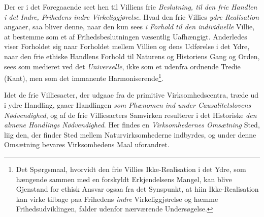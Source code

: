 Der er i det Foregaaende seet hen til Villiens frie \emph{Beslutning, til den
frie Handlen i det Indre, Frihedens indre Virkeliggjørelse}. Hvad den frie
Villies \emph{ydre Realisation} angaaer, saa bliver denne, naar den kun sees
\emph{i Forhold til den individuelle} Villie, at bestemme som et af
Frihedsbeslutningen væsentlig Uafhængigt. Anderledes viser Forholdet sig naar
Forholdet mellem Villien og dens Udførelse i det Ydre, naar den frie ethiske
Handlens Forhold til Naturens og Historiens Gang og Orden, sees som medieret ved
det \emph{Universelle}, ikke som et udenfra ordnende Tredie (Kant), men som det
immanente Harmoniserende\footnote{Det Spørgsmaal, hvorvidt den frie Villies
Ikke-Realisation i det Ydre, som hængende sammen med en forskyldt Erkjendelsens
Mangel, kan blive Gjenstand for ethisk Ansvar ogsaa fra det Synspunkt, at hiin
Ikke-Realisation kan virke tilbage paa Frihedens \emph{indre} Virkeliggjørelse
og hæmme Frihedsudviklingen, falder udenfor nærværende Undersøgelse.}.

 Idet de frie Villiesacter, der udgaae fra de primitive Virksomhedscentra, træde
ud i ydre Handling, gaaer Handlingen \emph{som Phænomen ind under
Causalitetslovens Nødvendighed}, og af de frie Villiesacters Samvirken
resulterer i det Historiske \emph{den almene Handlings Nødvendighed}. Her findes
en \emph{Virksomhedernes Omsætning} Sted, liig den, der finder Sted mellem
Naturvirksomhederne indbyrdes, og under denne Omsætning bevares Virksomhedens
Maal uforandret.


